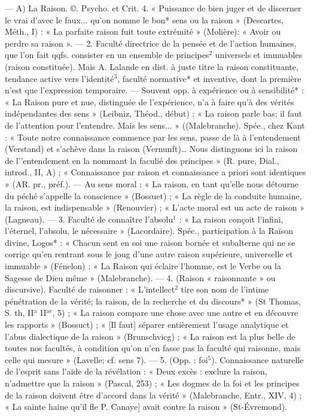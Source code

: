 \begin{itemize}[leftmargin=1cm, label=, itemsep=1pt]
 — A) La Raison. ©. Psycho.
et Crit. 4. « Puissance de bien juger
et de discerner le vrai d'avec le
faux... qu’on nomme le bon* sens
ou la raison » (Descartes, Méth., I) :
« La parfaite raison fuit toute extrémité » (Molière): « Avoir ou perdre
sa raison ». — 2. Faculté directrice
de la pensée et de l’action humaines,
que l’on fait qqfs. consister en un
ensemble de principes$^2$ universels
et immuables (raison constituée).
Mais A. Lalande en dist. à juste
titre la raison constituante, tendance
active vers l'identité$^3$, faculté normative* et inventive, dont la première n’est que l'expression temporaire. — Souvent opp. à expérience
ou à sensibilité* : « La Raison pure
et nue, distinguée de l'expérience,
n’a à faire qu'à des vérités indépendantes des sens » (Leibniz, Théod.,
début) ; « La raison parle bas; il faut
de l'attention pour l’entendre. Mais
les sens... » ((Malebranche). Spée.,
chez Kant : « Toute notre connaissance commence par les sens, passe
de là à l’entendement (Verstand) et
s’achève dans la raison (Vernunft)…
Nous distinguons ici la raison de
l’'entendement en la nommant la
faculié des principes » (R. pure,
Dial., introd., II, A) ; « Connaissance
par raison et connaissance a priori
sont identiques » (AR. pr., préf.). —
Au sens moral : « La raison, en tant
qu’elle nous détourne du péché
s'appelle la conscience » (Bossuet) ;
« La règle de la conduite humaine,
la raison, est indispensable » (Renouvier) ; « L'acte moral est un acte
de raison » (Lagneau). — 3. Faculté
de connaître l'absolu$^1$ : « La raison
conçoit l'infini, l'éternel, l'absolu,
le nécessaire » (Lacordaire). Spéc.,
participation à la Raïson divine,
Logos* : « Chacun sent en soi une
raison bornée et subalterne qui ne
se corrige qu'en rentrant sous le
joug d’une autre raison supérieure,
universelle et immuable » (Fénelon) ;
« La Raison qui éclaire l’homme,
est le Verbe ou la Sagesse de Dieu
même » (Malebranche). — 4. (Raison
« raisonnante » ou discursive). Faculté de raisonner : « L’intellect$^2$
tire son nom de l’intime pénétration de la vérité; la raison, de la
recherche et du discours* » (St Thomas, S. th, II$^\text{a}$ II$^\text{ae}$, 5) ; « La raison
compare une chose avec une autre
et en découvre les rapports » (Bossuct) ; « [Il faut] séparer entièrement l’usage analytique et l’abus
dialectique de la raison » (Brunschvicg) ; « La raison est la plus belle
de toutes nos facultés, à condition
qu’on n’en fasse pas la faculté qui
raisonne, mais celle qui mesure »
(Lavelle; cf. sens 7). — 5. (Opp. :
foi$^5$). Connaissance naturelle de
l’esprit sans l’aide de la révélation :
« Deux excès : exclure la raison,
n’admettre que la raison » (Pascal,
253) ; « Les dogmes de la foi et les
principes de la raison doivent être
d'accord dans la vérité » (Malebranche, Entr., XIV, 4) ; « La sainte
haine qu’il fle P. Canaye] avait
contre la raison » (St-Évremond).


\end{itemize}
